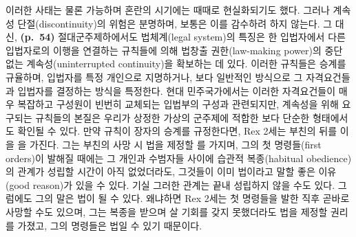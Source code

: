 이러한 사태는 물론 가능하며 혼란의 시기에는 때때로 현실화되기도 했다.
그러나 계속성 단절(discontinuity)의 위험은 분명하며, 보통은 이를
감수하려 하지 않는다. 그 대신, \textbf{(p.~54)} 절대군주제하에서도
법체계(legal system)의 특징은 한 입법자에서 다른 입법자로의 이행을
연결하는 규칙들에 의해 법창출 권한(law-making power)의 중단 없는
계속성(uninterrupted continuity)을 확보하는 데 있다. 이러한 규칙들은
 승계를 규율하며, 입법자를 특정 개인으로
지명하거나, 보다 일반적인 방식으로 그 자격요건들과 입법자를 결정하는
방식을 특정한다. 현대 민주국가에서는 이러한 자격요건들이 매우 복잡하고
구성원이 빈번히 교체되는 입법부의 구성과 관련되지만, 계속성을 위해
요구되는 규칙들의 본질은 우리가 상정한 가상의 군주제에 적합한 보다
단순한 형태에서도 확인될 수 있다. 만약 규칙이 장자의 승계를 규정한다면,
Rex 2세는 부친의 뒤를 이을 을 가진다. 그는 부친의 사망
시 법을 제정할 를 가지며, 그의 첫 명령들(first
orders)이 발해질 때에는 그 개인과 수범자들 사이에 습관적 복종(habitual
obedience)의 관계가 성립할 시간이 아직 없었더라도, 그것들이 이미
법이라고 말할 좋은 이유(good reason)가 있을 수 있다. 기실 그러한 관계는
끝내 성립하지 않을 수도 있다. 그럼에도 그의 말은 법이 될 수 있다.
왜냐하면 Rex 2세는 첫 명령들을 발한 직후 곧바로 사망할 수도 있으며, 그는
복종을 받으며 살 기회를 갖지 못했더라도 법을 제정할 권리를 가졌고, 그의
명령들은 법일 수 있기 때문이다.

